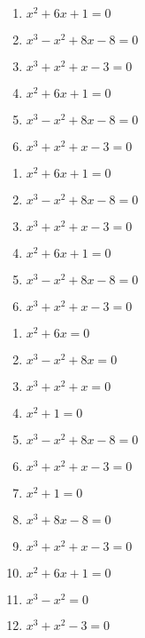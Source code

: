 \begin{exercise}
\item {}
		\begin{enumerate}[label=(\arabic{enumi}.\arabic*),leftmargin=2\parindent]
			\item $x^2+6x+1 = 0$
			\item $x^3-x^2+8x-8 = 0$
			\item $x^3+x^2+x-3 = 0$
			\item $x^2+6x+1 = 0$
			\item $x^3-x^2+8x-8 = 0$
			\item $x^3+x^2+x-3 = 0$
		\end{enumerate}
\item {}
		\begin{multicols}{2}
    		\begin{enumerate}[label=(\arabic{enumi}.\arabic*),leftmargin=2\parindent]
		        \item $x^2+6x+1 = 0$
				\item $x^3-x^2+8x-8 = 0$
				\item $x^3+x^2+x-3 = 0$
				\item $x^2+6x+1 = 0$
				\item $x^3-x^2+8x-8 = 0$
				\item $x^3+x^2+x-3 = 0$
    		\end{enumerate}
    	\end{multicols}
\item {}
		\begin{multicols}{3}
    		\begin{enumerate}[label=(\arabic{enumi}.\arabic*),leftmargin=2\parindent]
		        \item $x^2+6x = 0$
				\item $x^3-x^2+8x = 0$
				\item $x^3+x^2+x = 0$
				\item $x^2+1 = 0$
				\item $x^3-x^2+8x-8 = 0$
				\item $x^3+x^2+x-3 = 0$
				\item $x^2+1 = 0$
				\item $x^3+8x-8 = 0$
				\item $x^3+x^2+x-3 = 0$
				\item $x^2+6x+1 = 0$
				\item $x^3-x^2 = 0$
				\item $x^3+x^2-3 = 0$
    		\end{enumerate}
    	\end{multicols}
\end{exercise}

